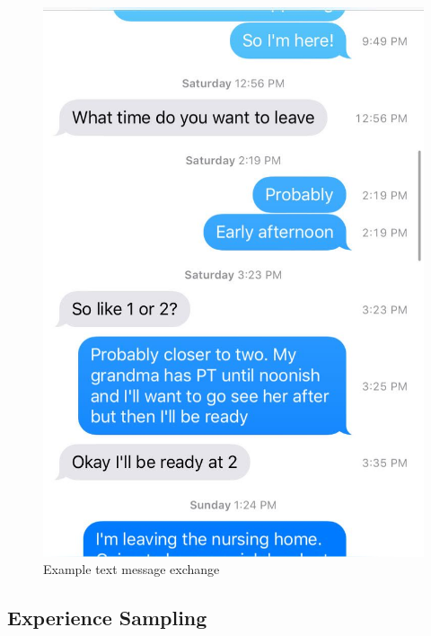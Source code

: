 \documentclass[12pt]{nuthesis}	%
\begin{document}

\begin{figure}[h]
\centering
\includegraphics[width=.7\textwidth]{figures/example_sia}
\caption{Example text message exchange}
\label{fig:sia}
\end{figure}


\subsection{Experience Sampling}
\end{document}

